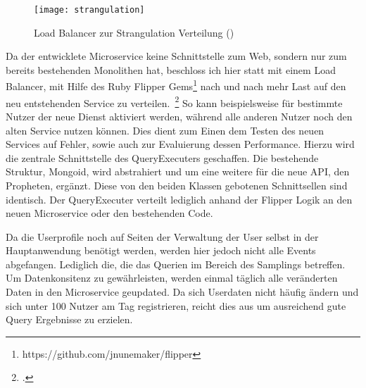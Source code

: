 \begin{figure}[h]
    \caption{Load Balancer zur Strangulation Verteilung (\cite{Hammant:Strangler})}
    \texttt{[image: strangulation]}
\end{figure}

Da der entwicklete Microservice keine Schnittstelle zum Web, sondern nur zum bereits bestehenden Monolithen hat, beschloss ich hier statt mit einem Load Balancer, mit Hilfe des Ruby Flipper Gems\footnote{https://github.com/jnunemaker/flipper} nach und nach mehr Last auf den neu entstehenden Service zu verteilen.~\footcite[vgl.][]{Hammant:Strangler} So kann beispielsweise für bestimmte Nutzer der neue Dienst aktiviert werden, während alle anderen Nutzer noch den alten Service nutzen können. Dies dient zum Einen dem Testen des neuen Services auf Fehler, sowie auch zur Evaluierung dessen Performance.
Hierzu wird die zentrale Schnittstelle des QueryExecuters geschaffen. Die bestehende Struktur, Mongoid, wird abstrahiert und um eine weitere für die neue API, den Propheten, ergänzt. Diese von den beiden Klassen gebotenen Schnittsellen sind identisch. Der QueryExecuter verteilt lediglich anhand der Flipper Logik an den neuen Microservice oder den bestehenden Code.

Da die Userprofile noch auf Seiten der Verwaltung der User selbst in der Hauptanwendung benötigt werden, werden hier jedoch nicht alle Events abgefangen. Lediglich die, die das Querien im Bereich des Samplings betreffen. Um Datenkonsitenz zu gewährleisten, werden einmal täglich alle veränderten Daten in den Microservice geupdated. Da sich Userdaten nicht häufig ändern und sich unter 100 Nutzer am Tag registrieren, reicht dies aus um ausreichend gute Query Ergebnisse zu erzielen.
